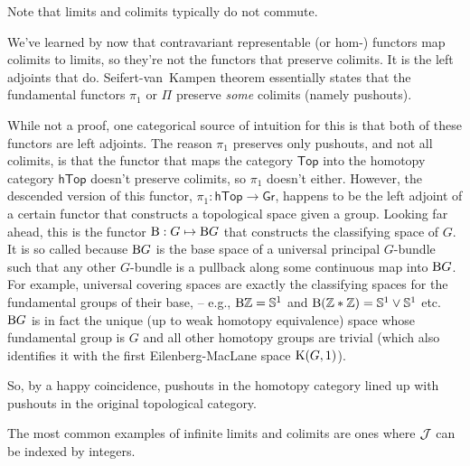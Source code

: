 Note that limits and colimits typically do not commute.

\begin{example}
    We've learned by now that contravariant representable (or hom-) functors map colimits to limits, so they're not the functors that preserve colimits. It is the left adjoints that do. Seifert-van~Kampen theorem essentially states that the fundamental functors $\pi_1$ or $\Pi$ preserve \emph{some} colimits (namely pushouts). 
    
    While not a proof, one categorical source of intuition for this is that both of these functors are left adjoints. The reason $\pi_1$ preserves only pushouts, and not all colimits, is that the functor that maps the category $\mathsf{Top}$ into the homotopy category $\mathsf{hTop}$ doesn't preserve colimits, so $\pi_1$ doesn't either. However, the descended version of this functor, $\pi_1:\mathsf{hTop}\to \mathsf{Gr}$, happens to be the left adjoint of a certain functor that constructs a topological space given a group. Looking far ahead, this is the functor $\mathrm{B}:G\mapsto \mathrm{B} G$ that constructs the classifying space of $G$. It is so called because $\mathrm{B} G$ is the base space of a universal principal $G$-bundle such that any other $G$-bundle is a pullback along some continuous map into $\mathrm{B} G$. For example, universal covering spaces are exactly the classifying spaces for the fundamental groups of their base, -- e.g., $\mathrm{B}\mathbb{Z}=\mathbb{S}^1$ and $\mathrm{B}(\mathbb{Z}\ast \mathbb{Z})=\mathbb{S}^1\vee \mathbb{S}^1$ etc. $\mathrm{B} G$ is in fact the unique (up to weak homotopy equivalence) space whose fundamental group is $G$ and all other homotopy groups are trivial (which also identifies it with the first  Eilenberg-MacLane space $\mathrm{K}(G,1)$).

    So, by a happy coincidence, pushouts in the homotopy category lined up with pushouts in the original topological category.
\end{example}

The most common examples of infinite limits and colimits are ones where $\mathcal{J} $ can be indexed by integers.

